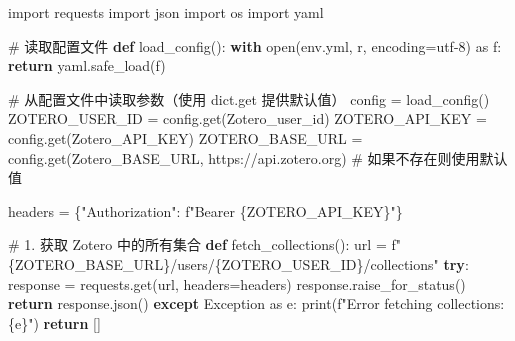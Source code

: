 \documentclass[
  letterpaper,
  DIV=11,
  numbers=noendperiod]{scrreprt}
\newenvironment{Shaded}{\begin{snugshade}}{\end{snugshade}}
\newcommand{\BuiltInTok}[1]{\textcolor[rgb]{0.00,0.23,0.31}{#1}}
\newcommand{\CommentTok}[1]{\textcolor[rgb]{0.37,0.37,0.37}{#1}}
\newcommand{\ControlFlowTok}[1]{\textcolor[rgb]{0.00,0.23,0.31}{\textbf{#1}}}
\newcommand{\ImportTok}[1]{\textcolor[rgb]{0.00,0.46,0.62}{#1}}
\newcommand{\KeywordTok}[1]{\textcolor[rgb]{0.00,0.23,0.31}{\textbf{#1}}}
\newcommand{\NormalTok}[1]{\textcolor[rgb]{0.00,0.23,0.31}{#1}}
\newcommand{\OperatorTok}[1]{\textcolor[rgb]{0.37,0.37,0.37}{#1}}
\newcommand{\PreprocessorTok}[1]{\textcolor[rgb]{0.68,0.00,0.00}{#1}}
\newcommand{\SpecialCharTok}[1]{\textcolor[rgb]{0.37,0.37,0.37}{#1}}
\newcommand{\SpecialStringTok}[1]{\textcolor[rgb]{0.13,0.47,0.30}{#1}}
\newcommand{\StringTok}[1]{\textcolor[rgb]{0.13,0.47,0.30}{#1}}
\begin{document}
\begin{Shaded}
\begin{Highlighting}[]
\ImportTok{import}\NormalTok{ requests}
\ImportTok{import}\NormalTok{ json}
\ImportTok{import}\NormalTok{ os}
\ImportTok{import}\NormalTok{ yaml}

\CommentTok{\# 读取配置文件}
\KeywordTok{def}\NormalTok{ load\_config():}
    \ControlFlowTok{with} \BuiltInTok{open}\NormalTok{(}\StringTok{\textquotesingle{}env.yml\textquotesingle{}}\NormalTok{, }\StringTok{\textquotesingle{}r\textquotesingle{}}\NormalTok{, encoding}\OperatorTok{=}\StringTok{\textquotesingle{}utf{-}8\textquotesingle{}}\NormalTok{) }\ImportTok{as}\NormalTok{ f:}
        \ControlFlowTok{return}\NormalTok{ yaml.safe\_load(f)}

\CommentTok{\# 从配置文件中读取参数（使用 dict.get 提供默认值）}
\NormalTok{config }\OperatorTok{=}\NormalTok{ load\_config()}
\NormalTok{ZOTERO\_USER\_ID }\OperatorTok{=}\NormalTok{ config.get(}\StringTok{\textquotesingle{}Zotero\_user\_id\textquotesingle{}}\NormalTok{)}
\NormalTok{ZOTERO\_API\_KEY }\OperatorTok{=}\NormalTok{ config.get(}\StringTok{\textquotesingle{}Zotero\_API\_KEY\textquotesingle{}}\NormalTok{)}
\NormalTok{ZOTERO\_BASE\_URL }\OperatorTok{=}\NormalTok{ config.get(}\StringTok{\textquotesingle{}Zotero\_BASE\_URL\textquotesingle{}}\NormalTok{, }\StringTok{\textquotesingle{}https://api.zotero.org\textquotesingle{}}\NormalTok{)  }\CommentTok{\# 如果不存在则使用默认值}

\NormalTok{headers }\OperatorTok{=}\NormalTok{ \{}\StringTok{"Authorization"}\NormalTok{: }\SpecialStringTok{f"Bearer }\SpecialCharTok{\{}\NormalTok{ZOTERO\_API\_KEY}\SpecialCharTok{\}}\SpecialStringTok{"}\NormalTok{\}}

\CommentTok{\# 1. 获取 Zotero 中的所有集合}
\KeywordTok{def}\NormalTok{ fetch\_collections():}
\NormalTok{    url }\OperatorTok{=} \SpecialStringTok{f"}\SpecialCharTok{\{}\NormalTok{ZOTERO\_BASE\_URL}\SpecialCharTok{\}}\SpecialStringTok{/users/}\SpecialCharTok{\{}\NormalTok{ZOTERO\_USER\_ID}\SpecialCharTok{\}}\SpecialStringTok{/collections"}
    \ControlFlowTok{try}\NormalTok{:}
\NormalTok{        response }\OperatorTok{=}\NormalTok{ requests.get(url, headers}\OperatorTok{=}\NormalTok{headers)}
\NormalTok{        response.raise\_for\_status()}
        \ControlFlowTok{return}\NormalTok{ response.json()}
    \ControlFlowTok{except} \PreprocessorTok{Exception} \ImportTok{as}\NormalTok{ e:}
        \BuiltInTok{print}\NormalTok{(}\SpecialStringTok{f"Error fetching collections: }\SpecialCharTok{\{}\NormalTok{e}\SpecialCharTok{\}}\SpecialStringTok{"}\NormalTok{)}
        \ControlFlowTok{return}\NormalTok{ []}


\end{Highlighting}
\end{Shaded}
\end{document}
